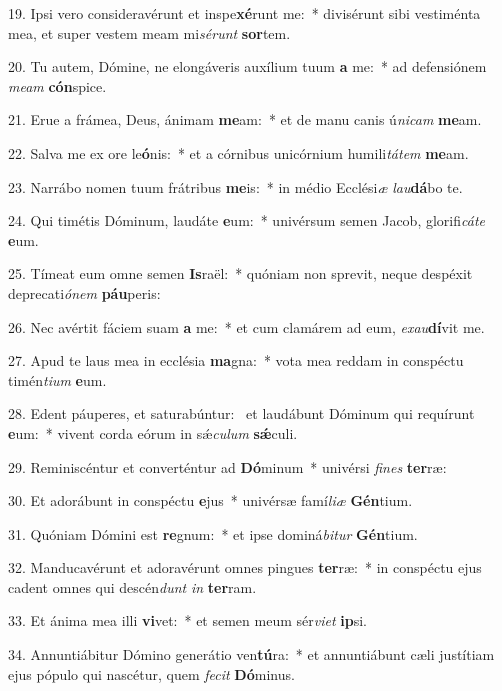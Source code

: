 19. Ipsi vero consideravérunt et inspe\textbf{xé}runt me:~*  divisérunt sibi vestiménta mea, et super vestem meam mi\textit{sé}\textit{runt} \textbf{sor}tem.\

20. Tu autem, Dómine, ne elongáveris auxílium tuum \textbf{a} me:~*  ad defensiónem \textit{me}\textit{am} \textbf{cón}spice.\

21. Erue a frámea, Deus, ánimam \textbf{me}am:~*  et de manu canis ú\textit{ni}\textit{cam} \textbf{me}am.\

22. Salva me ex ore le\textbf{ó}nis:~*  et a córnibus unicórnium humili\textit{tá}\textit{tem} \textbf{me}am.\

23. Narrábo nomen tuum frátribus \textbf{me}is:~*  in médio Ecclési\textit{æ} \textit{lau}\textbf{dá}bo te.\

24. Qui timétis Dóminum, laudáte \textbf{e}um:~*  univérsum semen Jacob, glorifi\textit{cá}\textit{te} \textbf{e}um.\

25. Tímeat eum omne semen \textbf{Is}raël:~*  quóniam non sprevit, neque despéxit deprecati\textit{ó}\textit{nem} \textbf{páu}peris:\

26. Nec avértit fáciem suam \textbf{a} me:~*  et cum clamárem ad eum, \textit{ex}\textit{au}\textbf{dí}vit me.\

27. Apud te laus mea in ecclésia \textbf{ma}gna:~*  vota mea reddam in conspéctu timén\textit{ti}\textit{um} \textbf{e}um.\

28. Edent páuperes, et saturabúntur: \dag\  et laudábunt Dóminum qui requírunt \textbf{e}um:~*  vivent corda eórum in sǽ\textit{cu}\textit{lum} \textbf{sǽ}culi.\

29. Reminiscéntur et converténtur ad \textbf{Dó}minum~*  univérsi \textit{fi}\textit{nes} \textbf{ter}ræ:\

30. Et adorábunt in conspéctu \textbf{e}jus~*  univérsæ famí\textit{li}\textit{æ} \textbf{Gén}tium.\

31. Quóniam Dómini est \textbf{re}gnum:~*  et ipse dominá\textit{bi}\textit{tur} \textbf{Gén}tium.\

32. Manducavérunt et adoravérunt omnes pingues \textbf{ter}ræ:~*  in conspéctu ejus cadent omnes qui descén\textit{dunt} \textit{in} \textbf{ter}ram.\

33. Et ánima mea illi \textbf{vi}vet:~*  et semen meum sér\textit{vi}\textit{et} \textbf{ip}si.\

34. Annuntiábitur Dómino generátio ven\textbf{tú}ra:~*  et annuntiábunt cæli justítiam ejus pópulo qui nascétur, quem \textit{fe}\textit{cit} \textbf{Dó}minus.\

